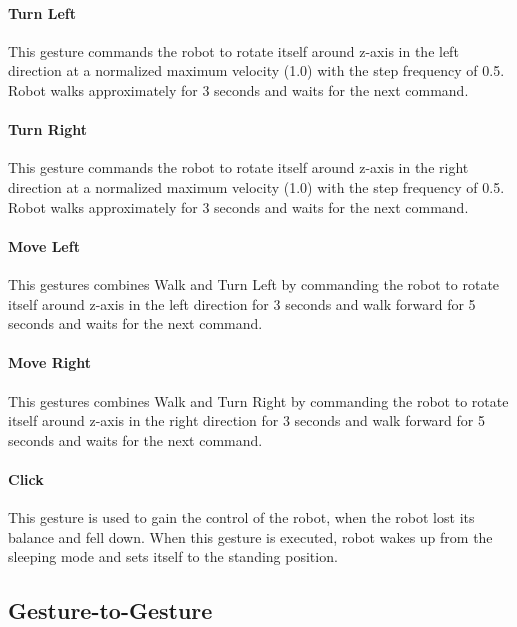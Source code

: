 \paragraph*{Turn Left} This gesture commands the robot to rotate itself around z-axis in the left direction at a normalized maximum velocity (1.0) with the step frequency of 0.5. Robot walks approximately for 3 seconds and waits for the next command.

\paragraph*{Turn Right} This gesture commands the robot to rotate itself around z-axis in the right direction at a normalized maximum velocity (1.0) with the step frequency of 0.5. Robot walks approximately for 3 seconds and waits for the next command.

\paragraph*{Move Left} This gestures combines Walk and Turn Left by commanding the robot to rotate itself around z-axis in the left direction for 3 seconds and walk forward for 5 seconds and waits for the next command.

\paragraph*{Move Right}  This gestures combines Walk and Turn Right by commanding the robot to rotate itself around z-axis in the right direction for 3 seconds and walk forward for 5 seconds and waits for the next command.

\paragraph*{Click} This gesture is used to gain the control of the robot, when the robot lost its balance and fell down. When this gesture is executed, robot wakes up from the sleeping mode and sets itself to the standing position.

\subsection{Gesture-to-Gesture}

